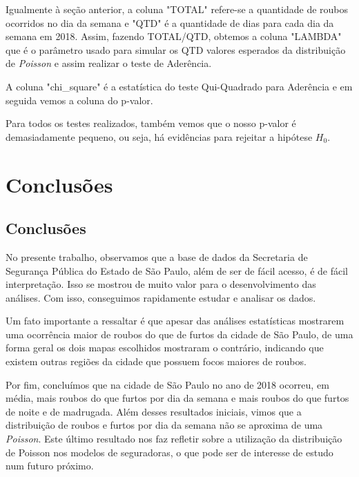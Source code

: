 \documentclass[
	12pt,
	openright,			%
	twoside,			%
	a4paper,			%
	chapter=TITLE,		%
	section=TITLE,		%
	subsection=TITLE,	%
	subsubsection=TITLE,%
	english,			%
	french,				%
	spanish,			%
	brazil				%
	]{abntex2}
\begin{document}
Igualmente à seção anterior, a coluna "TOTAL" refere-se a quantidade de roubos ocorridos no dia da semana e "QTD" é a quantidade de dias para cada dia da semana em 2018. Assim, fazendo TOTAL/QTD, obtemos a coluna "LAMBDA" que é o parâmetro usado para simular os QTD valores esperados da distribuição de \textit{Poisson} e assim realizar o teste de Aderência.

A coluna "chi\_square" é a estatística do teste Qui-Quadrado para Aderência e em seguida vemos a coluna do p-valor.

Para todos os testes realizados, também vemos que o nosso p-valor é demasiadamente pequeno, ou seja, há evidências para rejeitar a hipótese $H_0$.


\chapter{Conclusões}

\section{Conclusões}
No presente trabalho, observamos que a base de dados da Secretaria de Segurança Pública do Estado de São Paulo, além de ser de fácil acesso, é de fácil interpretação. Isso se mostrou de muito valor para o desenvolvimento das análises. Com isso, conseguimos rapidamente estudar e analisar os dados.

Um fato importante a ressaltar é que apesar das análises estatísticas mostrarem uma ocorrência maior de roubos do que de furtos da cidade de São Paulo, de uma forma geral os dois mapas escolhidos mostraram o contrário, indicando que existem outras regiões da cidade que possuem focos maiores de roubos. 

Por fim, concluímos que na cidade de São Paulo no ano de 2018 ocorreu, em média, mais roubos do que furtos por dia da semana e mais roubos do que furtos de noite e de madrugada. Além desses resultados iniciais, vimos que a distribuição de roubos e furtos por dia da semana não se aproxima de uma \textit{Poisson}. Este último resultado nos faz refletir sobre a utilização da distribuição de Poisson nos modelos de seguradoras, o que pode ser de interesse de estudo num futuro próximo.

\postextual
\end{document}
